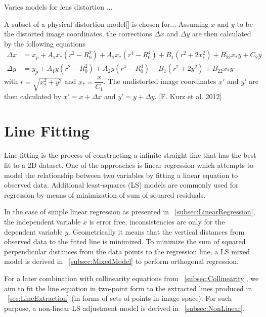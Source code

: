 Varies models for lens distortion ...

A subset of a physical distortion model[] is chosen for...
Assuming $x$ and $y$ to be the distorted image coordinates, the corrections $\Delta x$ and $\Delta y$ are then calculated by the following equations
\begin{equation} %
\begin{split}
\Delta x &= x_p + A_1x_*(r^2-R_0^2) + A_2x_*(r^4-R_0^4) + B_1(r^2+2x_*^2) + B_22x_*y+C_2y \\
\Delta y &= y_p + A_1y  (r^2-R_0^2) + A_2y  (r^4-R_0^4) + B_1(r^2+2y^2)   + B_22x_*y
\end{split}
\end{equation}
with $r=\sqrt{x_*^2+y^2}$ and $x_*=\dfrac{x}{C_1}$. The undistorted image coordinates $x\prime$ and $y\prime$ are then calculated by $x\prime=x+\Delta x$ and $y\prime=y+\Delta y$. [F. Kurz et al. 2012] 







\section{Line Fitting}
\label{sec:LineFitting}

Line fitting is the process of constructing a infinite straight line that has the best fit to a 2D dataset. One of the approaches is linear regression which attempts to model the relationship between two variables by fitting a linear equation to observed data. %
Additional least-squares (LS) models are commonly used for regression by means of minimization of sum of squared residuals.

In the case of simple linear regression as presented in ~\cref{subsec:LinearRegression}, the independent variable $x$ is error free, inconsistencies are only for the dependent variable $y$. Geometrically it means that the vertical distances from observed data to the fitted line is minimized. To minimize the sum of squared perpendicular distances from the data points to the regression line, a LS mixed model is derived in ~\cref{subsec:MixedModel} to perform orthogonal regression.

For a later combination with collinearity equations from ~\cref{subsec:Collinearity}, we aim to fit the line equation in two-point form to the extracted lines produced in ~\cref{sec:LineExtraction} (in forms of sets of points in image space). For such purpose, a non-linear LS adjustment model is derived in ~\cref{subsec:NonLinear}. 


